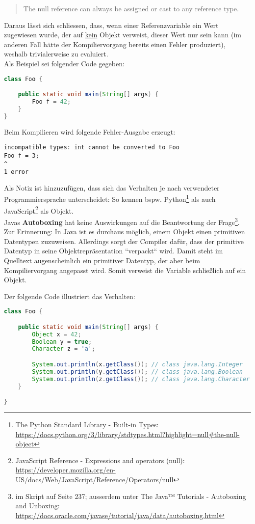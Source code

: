 \blockquote{
    The null reference can always be assigned or cast to any reference type.
}

Daraus lässt sich schliessen, dass, wenn einer Referenzvariable ein Wert zugewiesen wurde, der auf \underline{kein} Objekt verweist,
dieser Wert nur  sein kann (im anderen Fall hätte der Kompiliervorgang bereits einen Fehler produziert),
weshalb  trivialerweise zu  evaluiert.\\

Als Beispiel sei folgender Code gegeben:
\begin{lstlisting}[language=java]
class Foo {

    public static void main(String[] args) {
        Foo f = 42;
    }
}
\end{lstlisting}

Beim Kompilieren wird folgende Fehler-Ausgabe erzeugt:

\begin{lstlisting}[language=text]
incompatible types: int cannot be converted to Foo
Foo f = 3;
^
1 error
\end{lstlisting}

Als Notiz ist hinzuzufügen, dass sich das Verhalten je nach verwendeter Programmiersprache unterscheidet: So kennen
bspw. Python\footnote{
    The Python Standard Library - Built-in Types: \url{https://docs.python.org/3/library/stdtypes.html?highlight=null#the-null-object}
} als auch JavaScript\footnote{
    JavaScript Reference - Expressions and operators (null): \url{https://developer.mozilla.org/en-US/docs/Web/JavaScript/Reference/Operators/null}
}  als Objekt.\\

Javas \textbf{Autoboxing} hat keine Auswirkungen auf die Beantwortung der Frage\footnote{
    im Skript auf Seite 237; ausserdem unter
    The Java™ Tutorials - Autoboxing and Unboxing: \url{https://docs.oracle.com/javase/tutorial/java/data/autoboxing.html}
}.
Zur Erinnerung: In Java ist es durchaus möglich, einem Objekt einen primitiven Datentypen zuzuweisen.
Allerdings sorgt der Compiler dafür, dass der primitive Datentyp in seine Objektrepräsentation ``verpackt`` wird.
Damit steht im Quelltext augenscheinlich ein primitiver Datentyp, der aber beim Kompiliervorgang angepasst wird.
Somit verweist die Variable schließlich auf  ein Objekt.

Der folgende Code illustriert das Verhalten:

\begin{lstlisting}[language=java]
class Foo {

    public static void main(String[] args) {
        Object x = 42;
        Boolean y = true;
        Character z = 'a';

        System.out.println(x.getClass()); // class java.lang.Integer
        System.out.println(y.getClass()); // class java.lang.Boolean
        System.out.println(z.getClass()); // class java.lang.Character
    }

}
\end{lstlisting}

